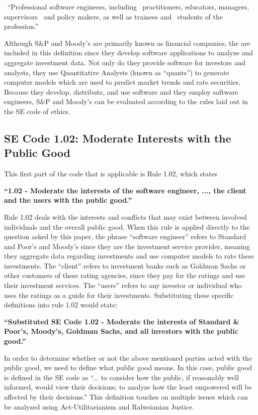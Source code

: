 \documentclass[11pt]{article}
\begin{document}
\begin{multicols}{2}
\ ``Professional software engineers, including
\ practitioners, educators, managers, supervisors
\ and policy makers, as well as trainees and
\ students of the profession.''

Although S\&P and Moody's are primarily known as financial companies, the are included in this definition since they develop software applications to analyze and aggregate investment data. \cite{SnP, Moodys} Not only do they provide software for investors and analysts, they use Quantitative Analysts (known as ``quants'') to generate computer models which are used to predict market trends and rate securities. \cite{quantsRole, govtReport}  Because they develop, distribute, and use software and they employ software engineers, S\&P and Moody's can be evaluated according to the rules laid out in the SE code of ethics. 

\subsection{SE Code 1.02: Moderate Interests with the Public Good}
This first part of the code that is applicable is Rule 1.02, which states
 

   \textbf{``1.02 - Moderate the interests of the software engineer, ..., the client and the users with the public good.''}


Rule 1.02 deals with the interests and conflicts that may exist between involved individuals and the overall public good.  When this rule is applied directly to the question asked by this paper, the phrase ``software engineer'' refers to Standard and Poor's and Moody's since they are the investment service provider, meaning they aggregate data regarding investments and use computer models to rate these investments. The ``client'' refers to investment banks such as Goldman Sachs or other customers of these rating agencies, since they pay for the ratings and use their investment services.  The ``users'' refers to any investor or individual who uses the ratings as a guide for their investments.  Substituting these specific definitions into rule 1.02 would state:


   \textbf{``Substituted SE Code 1.02 - Moderate the interests of Standard \& Poor's, Moody's, Goldman Sachs, and all investors with the public good.''}


In order to determine whether or not the above mentioned parties acted with the public good, we need to define what public good means.  In this case, public good is defined in the SE code as ``... to consider how the public, if reasonably well informed, would view their decisions; to analyze how the least empowered will be affected by their decisions.'' \cite{SECode}  This definition touches on multiple issues which can be analyzed using Act-Utilitarianism and Ralwsianian Justice. 


\end{multicols}
\end{document}
